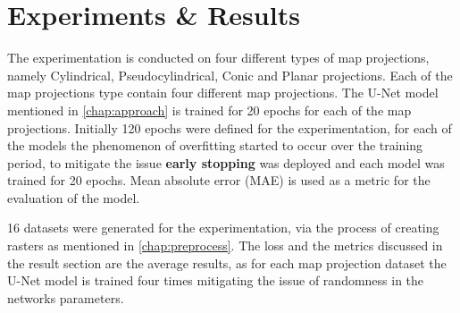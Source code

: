 
\clearpage
\cleardoublepage

\chapter{Experiments \& Results}

The experimentation is conducted on four different types of map projections, namely Cylindrical, Pseudocylindrical, Conic and Planar projections. Each of the map projections type contain four different map projections.
The U-Net model mentioned in \autoref{chap:approach} is trained for 20 epochs for each of the map projections. Initially 120 epochs were defined for the experimentation, for each of the models the phenomenon of overfitting started to occur over the training period, to mitigate the issue \textbf{early stopping} was deployed and each model was trained for 20 epochs.
Mean absolute error (MAE) is used as a metric for the evaluation of the model.

16 datasets were generated for the experimentation, via the process of creating rasters as mentioned in \autoref{chap:preprocess}. The loss and the metrics discussed in the result section are the average results, as for each map projection dataset the U-Net model is trained four times mitigating the issue of randomness in the networks parameters.

\clearpage

\clearpage

\clearpage


\clearpage


